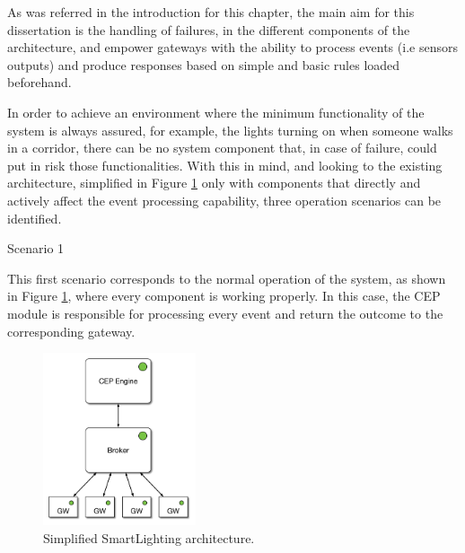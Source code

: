 As was referred in the introduction for this chapter, the main aim for this dissertation is the handling of failures, in the different components of the architecture, and empower gateways with the ability to process events (i.e sensors outputs) and produce responses based on simple and basic rules loaded beforehand.

In order to achieve an environment where the minimum functionality of the system is always assured, for example, the lights turning on when someone walks in a corridor, there can be no system component that, in case of failure, could put in risk those functionalities. With this in mind, and looking to the existing architecture, simplified in Figure \ref{fig:sc1} only with components that directly and actively affect the event processing capability, three operation scenarios can be identified. 



\begin{Paragraph}{Scenario 1}
	
	This first scenario corresponds to the normal operation of the system, as shown in Figure \ref{fig:sc1}, where every component is working properly. In this case, the CEP module is responsible for processing every event and return the outcome to the corresponding gateway.
	 
	 \begin{figure}[H]
	 	\centering
	 	\includegraphics[width=0.4\textwidth]{figures/sc1.png}
	 	\caption{Simplified SmartLighting architecture. }
	 	\label{fig:sc1}
	 \end{figure}
	 
\end{Paragraph}

